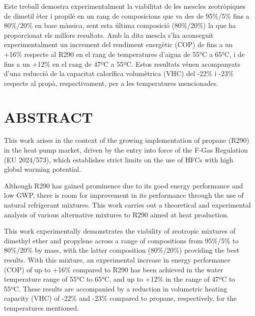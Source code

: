 \documentclass[../main.tex]{subfiles}
\begin{document}
Este treball demostra experimentalment la viabilitat de les mescles zeotròpiques de dimetil èter i propilé en un rang de composicions que va des de 95\%/5\% fins a 80\%/20\% en base màssica, sent esta última composició (80\%/20\%) la que ha proporcionat els millors resultats. Amb la dita mescla s'ha aconseguit experimentalment un increment del rendiment energètic (COP) de fins a un +16\% respecte al R290 en el rang de temperatures d'aigua de 55°C a 65°C, i de fins a un +12\% en el rang de 47ºC a 55ºC. Estos resultats vénen acompanyats d'una reducció de la capacitat calorífica volumètrica (VHC) del -22\% i -23\% respecte al propà, respectivament, per a les temperatures mencionades.

\chapter*{ABSTRACT}

This work arises in the context of the growing implementation of propane (R290) in the heat pump market, driven by the entry into force of the F-Gas Regulation (EU 2024/573), which establishes strict limits on the use of HFCs with high global warming potential.

Although R290 has gained prominence due to its good energy performance and low GWP, there is room for improvement in its performance through the use of natural refrigerant mixtures. This work carries out a theoretical and experimental analysis of various alternative mixtures to R290 aimed at heat production.

This work experimentally demonstrates the viability of zeotropic mixtures of dimethyl ether and propylene across a range of compositions from 95\%/5\% to 80\%/20\% by mass, with the latter composition (80\%/20\%) providing the best results. With this mixture, an experimental increase in energy performance (COP) of up to +16\% compared to R290 has been achieved in the water temperature range of 55°C to 65°C, and up to +12\% in the range of 47ºC to 55ºC. These results are accompanied by a reduction in volumetric heating capacity (VHC) of -22\% and -23\% compared to propane, respectively, for the temperatures mentioned.


\newpage
\end{document}
